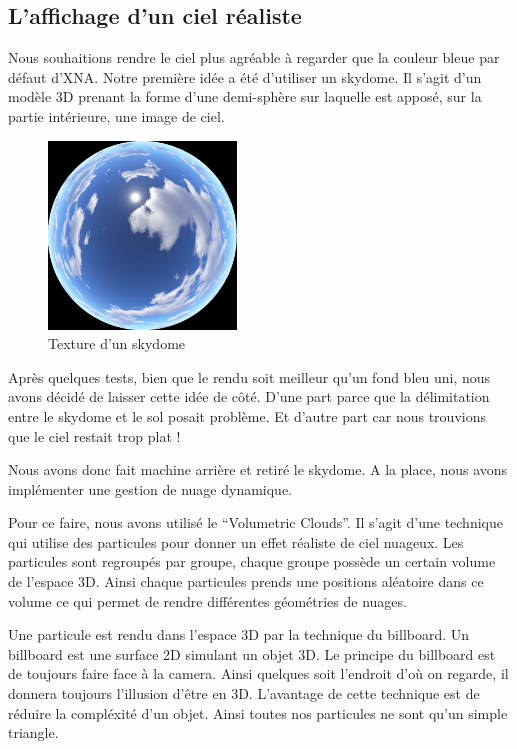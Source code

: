 \documentclass[11pt]{report}
\begin{document}
\subsection{L'affichage d'un ciel réaliste}

Nous souhaitions rendre le ciel plus agréable à regarder que la couleur bleue par défaut d'XNA. Notre première idée a été d’utiliser un skydome. Il s’agit d’un modèle 3D prenant la forme d’une demi-sphère sur laquelle est apposé, sur la partie intérieure, une image de ciel.

\begin{figure}[htbp]
\centering
\includegraphics[width=5cm]{skydome_texture.png}
\caption{Texture d'un skydome}
\end{figure}

Après quelques tests, bien que le rendu soit meilleur qu’un fond bleu uni, nous avons décidé de laisser cette idée de côté. D’une part parce que la délimitation entre le skydome et le sol posait problème. Et d’autre part car nous trouvions que le ciel restait trop plat !

Nous avons donc fait machine arrière et retiré le skydome. A la place, nous avons implémenter une gestion de nuage dynamique.

Pour ce faire, nous avons utilisé le ``Volumetric Clouds''. Il s'agit d'une technique qui utilise des particules pour donner un effet réaliste de ciel nuageux. Les particules sont regroupés par groupe, chaque groupe possède un certain volume de l'espace 3D. Ainsi chaque particules prends une positions aléatoire dans ce volume ce qui permet de rendre différentes géométries de nuages.

Une particule est rendu dans l'espace 3D par la technique du billboard. Un billboard est une surface 2D simulant un objet 3D. Le principe du billboard est de toujours faire face à la camera. Ainsi quelques soit l'endroit d'où on regarde, il donnera toujours l'illusion d'être en 3D. L'avantage de cette technique est de réduire la compléxité d'un objet. Ainsi toutes nos particules ne sont qu'un simple triangle.
\end{document}
